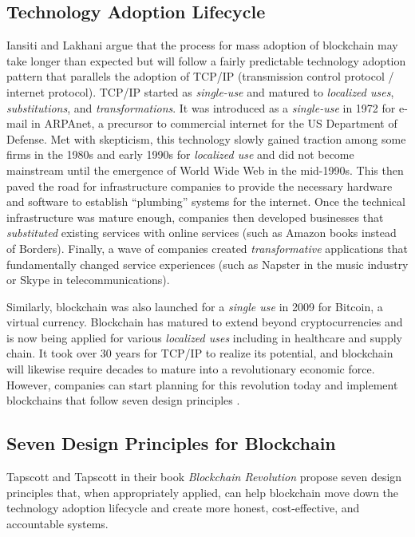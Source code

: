 \documentclass[sigconf]{acmart}
\begin{document}
\subsection{Technology Adoption Lifecycle}
Iansiti and Lakhani \cite{hbr} argue that the process for mass adoption of blockchain may take longer than expected but will follow a fairly predictable technology adoption pattern that parallels the adoption of TCP/IP (transmission control protocol / internet protocol). TCP/IP started as \textit{single-use} and matured to \textit{localized uses}, \textit{substitutions}, and \textit{transformations}. It was introduced as a \textit{single-use} in 1972 for e-mail in ARPAnet, a precursor to commercial internet for the US Department of Defense. Met with skepticism, this technology slowly gained traction among some firms in the 1980s and early 1990s for \textit{localized use} and did not become mainstream until the emergence of World Wide Web in the mid-1990s. This then paved the road for infrastructure companies to provide the necessary hardware and software to establish ``plumbing'' systems for the internet. Once the technical infrastructure was mature enough, companies then developed businesses that \textit{substituted} existing services with online services (such as Amazon books instead of Borders). Finally, a wave of companies created \textit{transformative} applications that fundamentally changed service experiences (such as Napster in the music industry or Skype in telecommunications).

Similarly, blockchain was also launched for a \textit{single use} in 2009 for Bitcoin, a virtual currency. Blockchain has matured to extend beyond cryptocurrencies and is now being applied for various \textit{localized uses} including in healthcare and supply chain. It took over 30 years for TCP/IP to realize its potential, and blockchain will likewise require decades to mature into a revolutionary economic force. However, companies can start planning for this revolution today and implement blockchains that follow seven design principles \cite{hbr} \cite{tapscott}.

\subsection{Seven Design Principles for Blockchain}
Tapscott and Tapscott \cite{tapscott} in their book \textit{Blockchain Revolution} propose seven design principles that, when appropriately applied, can help blockchain move down the technology adoption lifecycle and create more honest, cost-effective, and accountable systems.
\end{document}
